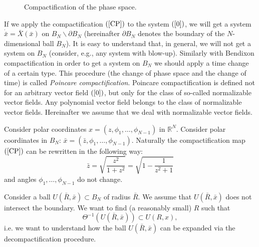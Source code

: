 \documentclass[11pt]{article}
\theoremstyle{Mystyle}
\begin{document}
\begin{figure}%
	\centering
\def\svgwidth{\columnwidth}

\caption{Compactification of the phase space.}
\label{Fig1}
\end{figure}

If we apply the compactification $(\ref{CP})$ to the system $(\ref{0})$, we will get a system $\dot{\bar{x}}=\bar{X}(\bar{x})$ on $B_N\backslash\partial B_N$ (hereinafter $\partial B_N$ denotes the boundary of the $N$-dimensional ball $B_N$). It is easy to understand that, in general, we will not get a system on $B_N$ (consider, e.g., any system with blow-up). Similarly with Bendixon compactification in order to get a system on $B_N$ we should apply a time change of a certain type. This procedure (the change of phase space and the change of time) is called \textit{Poincare compactification}.
Poincare compactification is defined not for an arbitrary vector field $(\ref{0})$, but only for the class of so-called normalizable vector fields. Any polynomial vector field belongs to the class of normalizable vector fields. Hereinafter we assume that we deal with normalizable vector fields.



Consider polar coordinates $x=(z,\phi_1,\ldots,\phi_{N-1})$ in $\mathbb{R}^N$. Consider polar coordinates in $B_N$: $\bar{x}=\left(\bar{z}, \phi_1,\ldots,\phi_{N-1} \right)$. Naturally the compactification map~$(\ref{CP})$ can be rewritten in the following way:
\begin{equation}
\label{rR}
\bar{z} = \sqrt{\frac{z^2}{1 + z^2}} = \sqrt{1 - \frac{1}{z^2 + 1}}
\end{equation}
and angles $\phi_1,\ldots,\phi_{N-1}$ do not change.

 Consider a ball $U(\bar{R},\bar{x})\subset B_N$ of radius $\bar{R}$. We assume that $U(\bar{R},\bar{x})$ does not intersect the boundary. We want to find (a reasonably small) $R$ such that
$$\Theta^{-1}(U(\bar{R},\bar{x})) \subset U(R,x),$$
i.e. we want to understand how the ball $U(\bar{R},\bar{x})$ can be expanded via the decompactification procedure.
\end{document}
